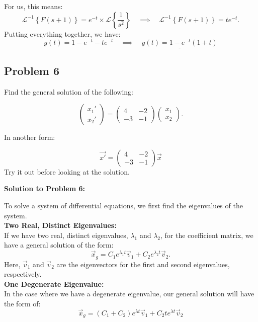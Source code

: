 \documentclass[a4paper,12pt]{article}
\begin{document}
For us, this means:
$$ \mathcal{L}^{-1}\left\{F(s+1)\right\} = e^{-t} \times \mathcal{L}\left\{\frac{1}{s^2}\right\} \quad\implies\quad \mathcal{L}^{-1}\left\{F(s+1)\right\} = te^{-t}. $$
Putting everything together, we have:
$$ y(t) = 1 - e^{-t} - te^{-t} \quad\implies\quad \underline{\boxed{y(t) = 1-e^{-t}(1+t)}} $$
\pagebreak

\subsection*{Problem 6} Find the general solution of the following:

$$ \left(\begin{matrix}
	x_1' \\
	x_2'
\end{matrix}\right) = \left(\begin{matrix}
	4 & -2 \\
	-3 & -1
\end{matrix}\right) \left(\begin{matrix}
	x_1 \\
	x_2
\end{matrix}\right).$$

In another form: 

$$ \vec{x'} = \left(\begin{matrix}
	4 & -2 \\
	-3 & -1
\end{matrix}\right)\vec{x} $$
Try it out before looking at the solution.
\pagebreak

\textbf{Solution to Problem 6:}

To solve a system of differential equations, we first find the eigenvalues of the system.\\

\textbf{Two Real, Distinct Eigenvalues:}\\
If we have two real, distinct eigenvalues, $\lambda_1$ and $\lambda_2$, for the coefficient matrix, we have a general solution of the form:
$$ \vec{x}_g = C_1e^{\lambda_1 t}\vec{v}_1 + C_2e^{\lambda_2 t}\vec{v}_2. $$
Here, $\vec{v}_1$ and $\vec{v}_2$ are the eigenvectors for the first and second eigenvalues, respectively.\\

\textbf{One Degenerate Eigenvalue:}\\
In the case where we have a degenerate eigenvalue, our general solution will have the form of:
$$ \vec{x}_g = (C_1 + C_2)e^{\lambda t}\vec{v}_1 + C_2te^{\lambda t}\vec{v}_2 $$
\end{document}
